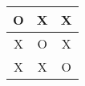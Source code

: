 \begin{center}
    \begin{tabular}{c|c|c}
      O & X & X \\      \hline
      X & O & X \\      \hline
      X & X & O
    \label{tab:tic_tac_toe}
    \end{tabular}
\end{center}
